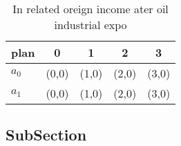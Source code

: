 \documentclass[a4paper]{article}
\begin{document}
\begin{table}
\begin{adjustbox}{width=0.7\columnwidth}
\begin{tabular}{|l|l|l|l|l|}
\hline
\textbf{plan} & \multicolumn{1}{c|}{\textbf{0}} & \multicolumn{1}{c|}{\textbf{1}} & \multicolumn{1}{c|}{\textbf{2}} & \multicolumn{1}{c|}{\textbf{3}} \\ \hline
\textbf{$a_0$}  & (0,0) & (1,0) & (2,0) & (3,0) \\ \hline
\textbf{$a_1$}  & (0,0) & (1,0) & (2,0) & (3,0) \\ \hline
\end{tabular}
\end{adjustbox}
\caption{In related oreign income ater oil industrial expo
}
\end{table}

\subsection{SubSection}
\end{document}
